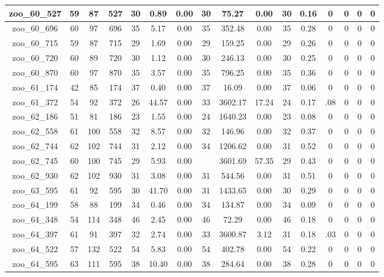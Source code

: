 \begin{landscape}
\begin{longtable}{|c|c|c|c|c|c|c|c|c|c|c|c|c|c|c|c|}
zoo\_60\_527 & 59 & 87 & 527 & 30 & 0.89 & 0.00 & 30 & 75.27 & 0.00 & 30 & 0.16 & 0 & 0 & 0 & 0 \\ \hline 
zoo\_60\_696 & 60 & 97 & 696 & 35 & 5.17 & 0.00 & 35 & 352.48 & 0.00 & 35 & 0.28 & 0 & 0 & 0 & 0 \\ \hline 
zoo\_60\_715 & 59 & 87 & 715 & 29 & 1.69 & 0.00 & 29 & 159.25 & 0.00 & 29 & 0.26 & 0 & 0 & 0 & 0 \\ \hline 
zoo\_60\_720 & 60 & 89 & 720 & 30 & 1.12 & 0.00 & 30 & 246.13 & 0.00 & 30 & 0.25 & 0 & 0 & 0 & 0 \\ \hline 
zoo\_60\_870 & 60 & 97 & 870 & 35 & 3.57 & 0.00 & 35 & 796.25 & 0.00 & 35 & 0.36 & 0 & 0 & 0 & 0 \\ \hline 
zoo\_61\_174 & 42 & 85 & 174 & 37 & 0.40 & 0.00 & 37 & 16.09 & 0.00 & 37 & 0.06 & 0 & 0 & 0 & 0 \\ \hline 
zoo\_61\_372 & 54 & 92 & 372 & 26 & 44.57 & 0.00 & 33 & 3602.17 & 17.24 & 24 & 0.17 & .08 & 0 & 0 & 0 \\ \hline 
zoo\_62\_186 & 51 & 81 & 186 & 23 & 1.55 & 0.00 & 24 & 1640.23 & 0.00 & 23 & 0.08 & 0 & 0 & 0 & 0 \\ \hline 
zoo\_62\_558 & 61 & 100 & 558 & 32 & 8.57 & 0.00 & 32 & 146.96 & 0.00 & 32 & 0.37 & 0 & 0 & 0 & 0 \\ \hline 
zoo\_62\_744 & 62 & 102 & 744 & 31 & 2.12 & 0.00 & 34 & 1206.62 & 0.00 & 31 & 0.52 & 0 & 0 & 0 & 0 \\ \hline 
zoo\_62\_745 & 60 & 100 & 745 & 29 & 5.93 & 0.00 &  & 3601.69 & 57.35 & 29 & 0.43 & 0 & 0 & 0 & 0 \\ \hline 
zoo\_62\_930 & 62 & 102 & 930 & 31 & 3.08 & 0.00 & 31 & 544.56 & 0.00 & 31 & 0.51 & 0 & 0 & 0 & 0 \\ \hline 
zoo\_63\_595 & 61 & 92 & 595 & 30 & 41.70 & 0.00 & 31 & 1433.65 & 0.00 & 30 & 0.29 & 0 & 0 & 0 & 0 \\ \hline 
zoo\_64\_199 & 58 & 88 & 199 & 34 & 0.46 & 0.00 & 34 & 134.87 & 0.00 & 34 & 0.09 & 0 & 0 & 0 & 0 \\ \hline 
zoo\_64\_348 & 54 & 114 & 348 & 46 & 2.45 & 0.00 & 46 & 72.29 & 0.00 & 46 & 0.18 & 0 & 0 & 0 & 0 \\ \hline 
zoo\_64\_397 & 61 & 91 & 397 & 32 & 2.74 & 0.00 & 33 & 3600.87 & 3.12 & 31 & 0.18 & .03 & 0 & 0 & 0 \\ \hline 
zoo\_64\_522 & 57 & 132 & 522 & 54 & 5.83 & 0.00 & 54 & 402.78 & 0.00 & 54 & 0.22 & 0 & 0 & 0 & 0 \\ \hline 
zoo\_64\_595 & 63 & 111 & 595 & 38 & 10.40 & 0.00 & 38 & 284.64 & 0.00 & 38 & 0.28 & 0 & 0 & 0 & 0 \\ \hline 

\end{longtable}
\end{landscape}
